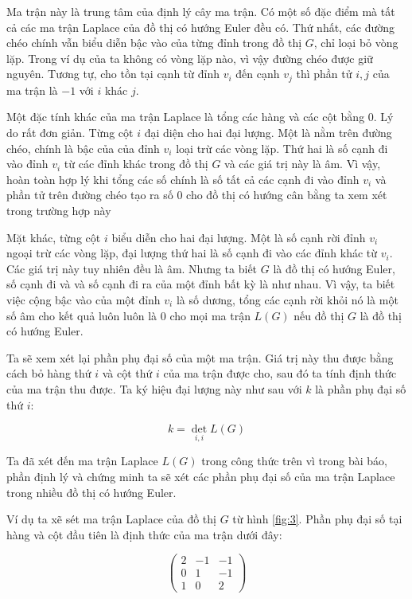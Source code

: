 \documentclass[14pt, a4paper]{article}
\numberwithin{equation}{section}
\numberwithin{figure}{section}
\numberwithin{dl}{section}
\numberwithin{md}{section}
\numberwithin{bd}{section}
\numberwithin{dn}{section}
\numberwithin{hq}{section}
\begin{document}
    Ma trận này là trung tâm của định lý cây ma trận.
    Có một số đặc điểm mà tất cả các ma trận Laplace của đồ thị có hướng Euler đều có.
    Thứ nhất, các đường chéo chính vẫn biểu diễn bậc vào của từng đỉnh trong đồ thị $G$, chỉ loại bỏ vòng lặp.
    Trong ví dụ của ta không có vòng lặp nào, vì vậy đường chéo được giữ nguyên.
    Tương tự, cho tồn tại cạnh từ đỉnh $v_i$ đến cạnh $v_j$ thì phần tử $i, j$ của ma trận là $-1$ với $i$ khác $j$.

    Một đặc tính khác của ma trận Laplace là tổng các hàng và các cột bằng 0.
    Lý do rất đơn giản. Từng cột $i$ đại diện cho hai đại lượng. Một là nằm trên đường chéo, chính là bậc của của đỉnh $v_i$ loại trừ các vòng lặp.
    Thứ hai là số cạnh đi vào đỉnh $v_i$ từ các đỉnh khác trong đồ thị $G$ và các giá trị này là âm. 
    Vì vậy, hoàn toàn hợp lý khi tổng các số chính là số tất cả các cạnh đi vào đỉnh $v_i$ và phần tử trên đường chéo tạo ra số 0 cho đồ thị có hướng cân bằng ta xem xét trong trường hợp này

    Mặt khác, từng cột $i$ biểu diễn cho hai đại lượng.
    Một là số cạnh rời đỉnh $v_i$ ngoại trừ các vòng lặp, đại lượng thứ hai là số cạnh đi vào các đỉnh khác từ $v_i$.
    Các giá trị này tuy nhiên đều là âm.
    Nhưng ta biết $G$ là đồ thị có hướng Euler, số cạnh đi và và số cạnh đi ra của một đỉnh bất kỳ là như nhau.
    Vì vậy, ta biết việc cộng bậc vào của một đỉnh $v_i$ là số dương, tổng các cạnh rời khỏi nó là một số âm cho kết quả luôn luôn là 0 cho mọi ma trận $L(G)$ nếu đồ thị $G$ là đồ thị có hướng Euler.

    Ta sẽ xem xét lại phần phụ đại số của một ma trận.
    Giá trị này thu được bằng cách bỏ hàng thứ $i$ và cột thứ $i$ của ma trận được cho, sau đó ta tính định thức của ma trận thu được.
    Ta ký hiệu đại lượng này như sau với $k$ là phần phụ đại số thứ $i$:

    \begin{equation}
        k = \det_{i, i} L(G)
    \end{equation}

    Ta đã xét đến ma trận Laplace $L(G)$ trong công thức trên vì trong bài báo, phần định lý và chứng minh ta sẽ xét các phần phụ đại số của ma trận Laplace trong nhiều đồ thị có hướng Euler.

    Ví dụ ta xẽ sét ma trận Laplace của đồ thị $G$ từ hình \ref{fig:3}.
    Phần phụ đại số tại hàng và cột đầu tiên là định thức của ma trận dưới đây:


    \begin{equation*}
        \begin{pmatrix}
            2 & -1 & -1 \\
            0 & 1 & -1 \\
            1 & 0 & 2
        \end{pmatrix}
    \end{equation*}
\end{document}
